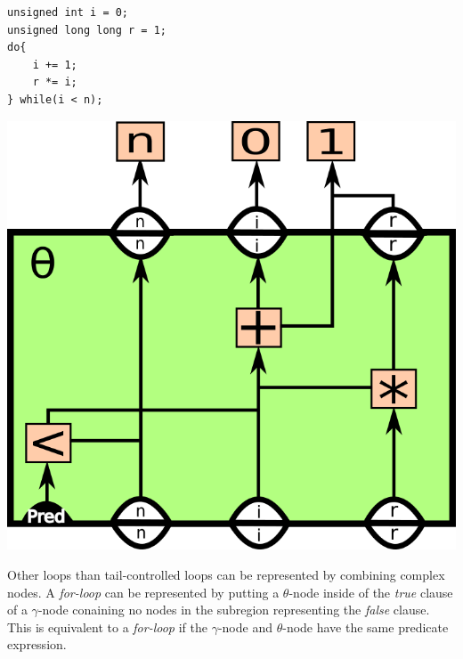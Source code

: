 \begin{itemize}
\begin{centering}
	\noindent\begin{minipage}{0.36\textwidth}
		\begin{CenteredBox}
		\begin{lstlisting}[style=global_customcpp,
label={lst:fig:factorial_loop_ex}, basicstyle=\fontsize{10}{1}]
unsigned int i = 0;
unsigned long long r = 1;
do{
	i += 1;
	r *= i;
} while(i < n);
		\end{lstlisting}
		\end{CenteredBox}
	\end{minipage}
	\noindent\begin{minipage}{0.55\textwidth}
		\captionsetup{type=figure}
		\includegraphics[width=\textwidth]{figures/iterative_factorial_ex}
	\end{minipage}
	\label{fig:factorial_loop_ex}
\end{centering}

Other loops than tail-controlled loops can be represented by combining complex
nodes. A \textit{for-loop} can be represented by putting a $\theta$-node inside
of the \textit{true} clause of a $\gamma$-node conaining no nodes in the
subregion representing the \textit{false} clause. This is equivalent to a
\textit{for-loop} if the $\gamma$-node and $\theta$-node have the same predicate
expression.


\end{itemize}
